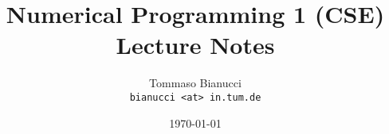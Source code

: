 


\title{Numerical Programming 1 (CSE)\\Lecture Notes}
\author{Tommaso Bianucci\\\texttt{bianucci <at> in.tum.de}}
\date{\today}


\maketitle
\tableofcontents
 


% 
% 
% 


